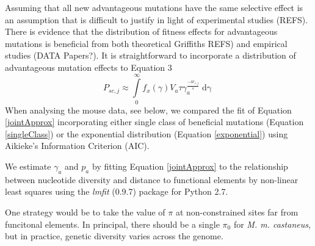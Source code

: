 \documentclass[11pt]{article}
\begin{document}
	Assuming that all new advantageous mutations have the same selective effect is an assumption that is difficult to justify in light of experimental studies (REFS). There is evidence that the distribution of fitness effects for advantageous mutations is beneficial from both theoretical \cite{RN362} Griffiths REFS) and empirical studies (DATA Papers?). It is straightforward to incorporate a distribution of advantageous mutation effects to Equation 3
		\begin{equation}
		\label{exponential}
P_{sc,j} \approx \int \limits_{0}^{\infty} f_x(\gamma) V_a \tau\gamma_a^{\frac{-4r_{i,j}}{s}} \mathop{d\gamma}
		\end{equation}
When analysing the mouse data, see below, we compared the fit of Equation \ref{jointApprox} incorporating either single class of beneficial mutations (Equation \ref{singleClass}) or the exponential distribution (Equation \ref{exponential}) using Aikieke's Information Criterion (AIC).
	
	We estimate $\gamma_a$ and $p_a$ by fitting Equation \ref{jointApprox} to	the relationship between nucleotide diversity and distance to functional elements by non-linear least squares using the \emph{lmfit} (0.9.7) package for Python 2.7.
	
	
	 One strategy would be to take the value of $\pi$ at non-constrained sites far from funcitonal elements. In principal, there should be a single $\pi_0$ for \textit{M. m. castaneus}, but in practice, genetic diversity varies across the genome. 
	
%
%
\end{document}
